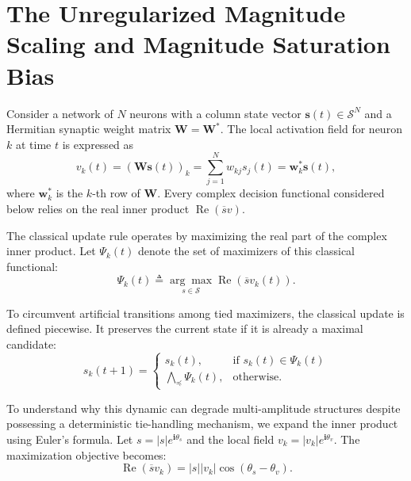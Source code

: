 \documentclass[10pt,journal,letterpaper]{IEEEtran}
\begin{document}
\section{The Unregularized Magnitude Scaling and Magnitude Saturation Bias}
\label{sec:bias}

Consider a network of $N$ neurons with a column state vector $\boldsymbol{s}(t) \in \mathcal{S}^N$ and a Hermitian synaptic weight matrix $\boldsymbol{W}=\boldsymbol{W}^*$. The local activation field for neuron $k$ at time $t$ is expressed as
\begin{equation}
    v_k(t) = (\boldsymbol{W}\boldsymbol{s}(t))_k
           = \sum_{j=1}^N w_{kj}s_j(t)
           = \boldsymbol{w}_k^*\boldsymbol{s}(t),
\end{equation}
where $\boldsymbol{w}_k^*$ is the $k$-th row of $\boldsymbol{W}$. Every complex
decision functional considered below relies on the real inner product
$\operatorname{Re}(\overline{s}v)$.

The classical update rule operates by maximizing the real part of the complex
inner product. Let $\Psi_k(t)$ denote the set of maximizers of this classical
functional:
\begin{equation}
    \Psi_k(t) \triangleq \underset{s \in \mathcal{S}}{\arg\max} \operatorname{Re}(\overline{s} v_k(t)).
\end{equation}

To circumvent artificial transitions among tied maximizers, the classical update is defined piecewise. It preserves the current state if it is already a maximal candidate:
\begin{equation}
    s_k(t+1) = 
    \begin{cases} 
    s_k(t), & \text{if } s_k(t) \in \Psi_k(t) \\
    \bigwedge_{\preceq}\Psi_k(t), & \text{otherwise}.
    \end{cases}
\label{eq:classical_rule}
\end{equation}

To understand why this dynamic can degrade multi-amplitude structures despite possessing a deterministic tie-handling mechanism, we expand the inner product using Euler's formula. Let $s = |s|e^{\mathbf{i}\theta_s}$ 
and the local field $v_k = |v_k|e^{\mathbf{i}\theta_v}$. The maximization 
objective becomes:
\begin{equation}
    \operatorname{Re}(\overline{s} v_k) = |s| |v_k| \cos(\theta_s - \theta_v).
\label{eq:cosine_expansion}
\end{equation}
\end{document}
